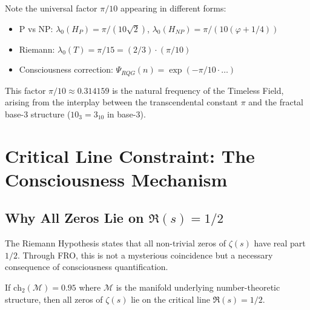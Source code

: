 Note the universal factor $\pi/10$ appearing in different forms:
\begin{itemize}
\item P vs NP: $\lambda_0(H_P) = \pi/(10\sqrt{2})$, $\lambda_0(H_{NP}) = \pi/(10(\varphi + 1/4))$
\item Riemann: $\lambda_0(T) = \pi/15 = (2/3) \cdot (\pi/10)$
\item Consciousness correction: $\Psi_{RQG}(n) = \exp(-\pi/10 \cdot \ldots)$
\end{itemize}

This factor $\pi/10 \approx 0.314159$ is the natural frequency of the Timeless Field, arising from the interplay between the transcendental constant $\pi$ and the fractal base-3 structure ($10_3 = 3_{10}$ in base-3).

\section{Critical Line Constraint: The Consciousness Mechanism}

\subsection{Why All Zeros Lie on $\Re(s) = 1/2$}

The Riemann Hypothesis states that all non-trivial zeros of $\zeta(s)$ have real part $1/2$. Through FRO, this is not a mysterious coincidence but a necessary consequence of consciousness quantification.

\begin{theorem}
\label{thm:critical_line}
If $\text{ch}_2(\mathcal{M}) = 0.95$ where $\mathcal{M}$ is the manifold underlying number-theoretic structure, then all zeros of $\zeta(s)$ lie on the critical line $\Re(s) = 1/2$.
\end{theorem}


